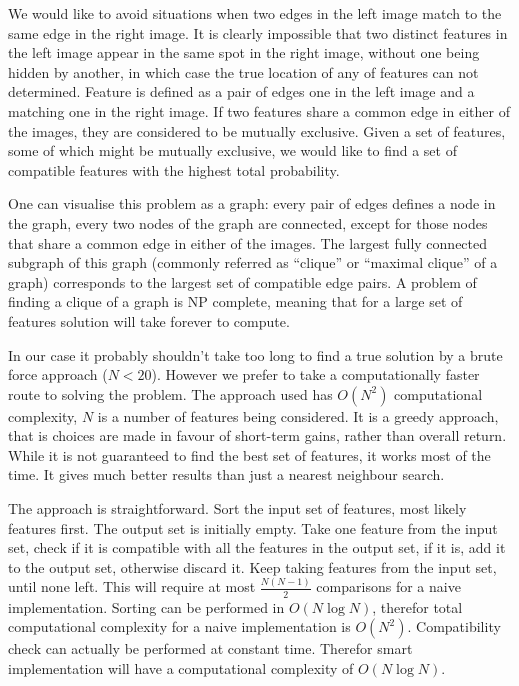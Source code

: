 We would like to avoid situations when two edges in the left image
match to the same edge in the right image. It is clearly impossible
that two distinct features in the left image appear in the same spot
in the right image, without one being hidden by another, in which case
the true location of any of features can not determined. Feature
is defined as a pair of edges one in the left image and a matching one
in the right image. If two features share a common edge in either of
the images, they are considered to be mutually exclusive.  Given a set
of features, some of which might be mutually exclusive, we would like
to find a set of compatible features with the highest total
probability.

One can visualise this problem as a graph: every pair of edges defines
a node in the graph, every two nodes of the graph are connected,
except for those nodes that share a common edge in either of the
images. The largest fully connected subgraph of this graph (commonly
referred as ``clique'' or ``maximal clique'' of a graph) corresponds
to the largest set of compatible edge pairs. A problem of finding a
clique of a graph is NP complete, meaning that for a large set of
features solution will take forever to compute.

In our case it probably shouldn't take too long to find a true
solution by a brute force approach ($N<20$). However we prefer to take
a computationally faster route to solving the problem. The approach
used has $O(N^2)$ computational complexity, $N$ is a number of
features being considered. It is a greedy approach, that is choices
are made in favour of short-term gains, rather than overall return.
While it is not guaranteed to find the best set of features, it works
most of the time. It gives much better results than just a nearest
neighbour search.

The approach is straightforward. Sort the input set of features, most
likely features first. The output set is initially empty. Take one
feature from the input set, check if it is compatible with all the
features in the output set, if it is, add it to the output set,
otherwise discard it.  Keep taking features from the input set, until
none left. This will require at most $\frac{N(N-1)}{2}$ comparisons
for a naive implementation.  Sorting can be performed in $O(N\log N)$,
therefor total computational complexity for a naive implementation is
$O(N^2)$. Compatibility check can actually be performed at constant
time. Therefor smart implementation will have a computational
complexity of $O(N\log N)$.


